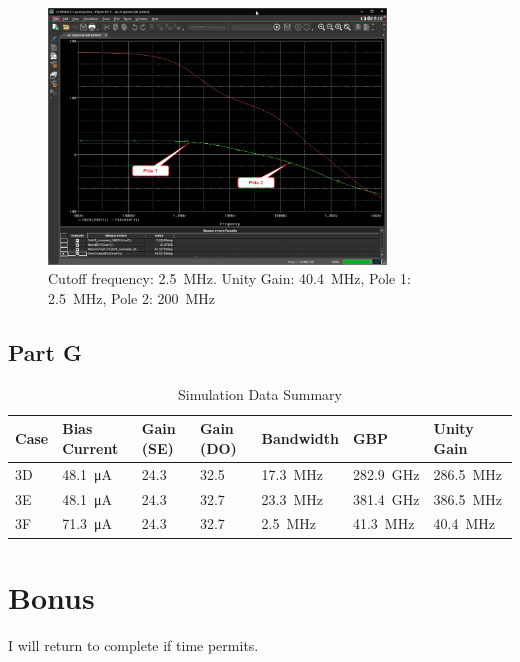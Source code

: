 \documentclass{article}
\newcommand \imgWidthFactor{0.8}
\begin{document}
		\begin{figure}[H]
			\centering
			\includegraphics[width=\imgWidthFactor\textwidth]{f1}
			\caption{Cutoff frequency: \SI{2.5}{\MHz}. Unity Gain: \SI{40.4}{\MHz}, Pole 1: \SI{2.5}{\MHz}, Pole 2: \SI{200}{\MHz} }
		\end{figure}

	\subsection{Part G}
	
	\begin{table}[htbp]
		\centering
		\caption{Simulation Data Summary}
		\label{tab:state_machine}
		\begin{tabular}{lllllll}
			\toprule
			\textbf{Case} & \textbf{Bias Current} & \textbf{Gain (SE)} & \textbf{Gain (DO)} & \textbf{Bandwidth} & \textbf{GBP} & \textbf{Unity Gain}\\
			\midrule
			3D & \SI{48.1}{\uA} & \SI{24.3}{} & \SI{32.5}{} & \SI{17.3}{\MHz} & \SI{282.9}{\GHz} & \SI{286.5}{\MHz}\\
			3E & \SI{48.1}{\uA} & \SI{24.3}{} & \SI{32.7}{} & \SI{23.3}{\MHz} & \SI{381.4}{\GHz} & \SI{386.5}{\MHz}\\
			3F & \SI{71.3}{\uA} & \SI{24.3}{} & \SI{32.7}{} & \SI{2.5}{\MHz}  & \SI{41.3}{\MHz} & \SI{40.4}{\MHz}\\
			\bottomrule
		\end{tabular}
	\end{table}

	\section{Bonus}

	I will return to complete if time permits.
\end{document}
